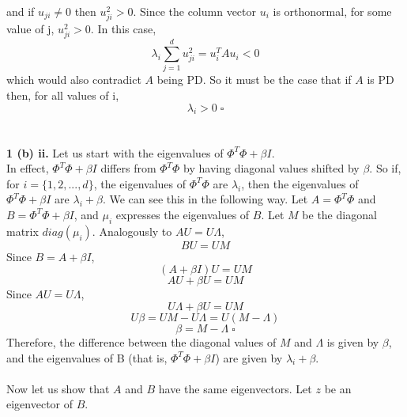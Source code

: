 \documentclass[12 pt]{article}        	%
\begin{document}
and if $ u_{ji} \neq 0 $ then $ u_{ji}^2 > 0 $. 
Since the column vector $ u_i $ is orthonormal, for some value of j, $ u_{ji}^2 > 0 $. In this case,
\begin{displaymath}
  \lambda_i \sum_{j=1}^{d}u_{ji}^2 = u_i^T A u_i < 0
\end{displaymath}
which would also contradict $ A $ being PD. So it must be the case that if $ A $ is PD then, for all values of i,
\begin{displaymath}
  \lambda_i > 0 \; \square
\end{displaymath} \\ \\
\textbf{1 (b) ii.} Let us start with the eigenvalues of $ \Phi^T \Phi + \beta I $. \\
In effect, $ \Phi^T \Phi + \beta I $ differs from $ \Phi^T \Phi $ by having diagonal values shifted by $ \beta $. 
So if, for $ i = \{1, 2, ..., d\} $, the eigenvalues of $ \Phi^T \Phi $ are $ \lambda_i $, then the eigenvalues of $ \Phi^T \Phi + \beta I $ 
are $ \lambda_i + \beta $. We can see this in the following way. 
Let $ A = \Phi^T \Phi $ and $ B = \Phi^T \Phi + \beta I $, and $ \mu_i $ expresses the eigenvalues of $ B $. 
Let $ M $ be the diagonal matrix $ diag(\mu_i) $. Analogously to $ AU = U \Lambda $,
\begin{displaymath}
  BU = U M
\end{displaymath}
Since $ B = A + \beta I $,
\begin{displaymath}
  (A + \beta I) U = U M
\end{displaymath}
\begin{displaymath}
  AU + \beta U = U M
\end{displaymath}
Since $ A U = U \Lambda $,
\begin{displaymath}
  U \Lambda + \beta U = U M
\end{displaymath}
\begin{displaymath}
  U \beta = U M - U \Lambda = U (M - \Lambda)
\end{displaymath}
\begin{displaymath}
  \beta = M - \Lambda \; \square
\end{displaymath}
Therefore, the difference between the diagonal values of $ M $ and $ \Lambda $ is given by $ \beta $,
and the eigenvalues of B (that is, $ \Phi^T \Phi + \beta I $) are given by $ \lambda_i + \beta $. \\ \\
Now let us show that $ A $ and $ B $ have the same eigenvectors. Let $ z $ be an eigenvector of $ B $.
\end{document}

